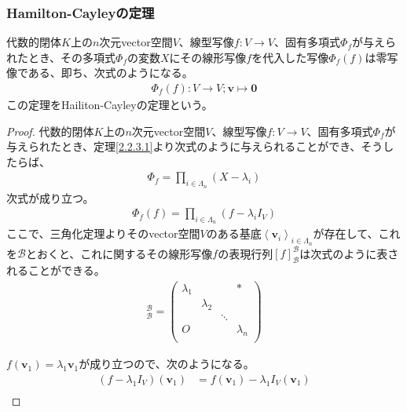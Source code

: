 \documentclass[dvipdfmx]{jsarticle}
\begin{document}
\subsubsection{Hamilton-Cayleyの定理}%
\begin{thm}\label{2.2.3.9}
代数的閉体$K$上の$n$次元vector空間$V$、線型写像$f:V \rightarrow V$、固有多項式$\varPhi_{f}$が与えられたとき、その多項式$\varPhi_{f}$の変数$X$にその線形写像$f$を代入した写像$\varPhi_{f}(f)$は零写像である、即ち、次式のようになる。
\begin{align*}
\varPhi_{f}(f):V \rightarrow V;\mathbf{v} \mapsto \mathbf{0}
\end{align*}
この定理をHailiton-Cayleyの定理という。
\end{thm}
\begin{proof}
代数的閉体$K$上の$n$次元vector空間$V$、線型写像$f:V \rightarrow V$、固有多項式$\varPhi_{f}$が与えられたとき、定理\ref{2.2.3.1}より次式のように与えられることができ、そうしたらば、
\begin{align*}
\varPhi_{f} = \prod_{i \in \varLambda_{n}} \left( X - \lambda_{i} \right)
\end{align*}
次式が成り立つ。
\begin{align*}
\varPhi_{f}(f) = \prod_{i \in \varLambda_{n}} \left( f - \lambda_{i}I_{V} \right)
\end{align*}
ここで、三角化定理よりそのvector空間$V$のある基底$\left\langle \mathbf{v}_{i} \right\rangle_{i \in \varLambda_{n}}$が存在して、これを$\mathcal{B}$とおくと、これに関するその線形写像$f$の表現行列$[ f]_{\mathcal{B}}^{\mathcal{B}}$は次式のように表されることができる。
\begin{align*}
[ f]_{\mathcal{B}}^{\mathcal{B}} = \begin{pmatrix}
\lambda_{1} & \  & \  & * \\
\  & \lambda_{2} & \  & \  \\
\  & \  & \ddots & \  \\
O & \  & \  & \lambda_{n} \\
\end{pmatrix}
\end{align*}\par
$f\left( \mathbf{v}_{1} \right) = \lambda_{1}\mathbf{v}_{1}$が成り立つので、次のようになる。
\begin{align*}
\left( f - \lambda_{1}I_{V} \right)\left( \mathbf{v}_{1} \right) &= f\left( \mathbf{v}_{1} \right) - \lambda_{1}I_{V}\left( \mathbf{v}_{1} \right)\\

\end{align*}
\end{proof}
\end{document}
